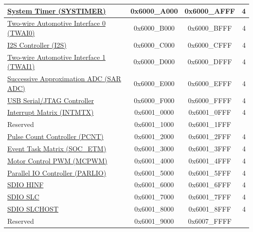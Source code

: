 \begin{ThreePartTable}
\begin{longtable}[c]{ |p{7cm}|c|c|r| }
\hyperref[mod:systimer]{System Timer (SYSTIMER)}                & 0x6000\_A000 & 0x6000\_AFFF &   4        \\\hline
\hyperref[mod:twai]{Two-wire Automotive Interface 0 (TWAI0)}                      & 0x6000\_B000 & 0x6000\_BFFF &   4        \\\hline
\hyperref[mod:i2s]{I2S Controller (I2S)}            & 0x6000\_C000 & 0x6000\_CFFF &   4     \\\hline
\hyperref[mod:twai]{Two-wire Automotive Interface 1 (TWAI1)}                      & 0x6000\_D000 & 0x6000\_DFFF &   4        \\\hline
\hyperref[mod:sensor]{Successive Approximation ADC (SAR ADC)}              & 0x6000\_E000 & 0x6000\_EFFF &   4        \\\hline
\hyperref[mod:usbserialjtag]{USB Serial/JTAG Controller}                  & 0x6000\_F000 & 0x6000\_FFFF &   4     \\\hline

\hyperref[mod:intmtrx]{Interrupt Matrix (INTMTX)}            & 0x6001\_0000 & 0x6001\_0FFF &   4     \\\hline
    \rowcolor{gray!25}  Reserved                    & 0x6001\_1000 & 0x6001\_1FFF &        \\\hline
\hyperref[mod:pcnt]{Pulse Count Controller (PCNT)}& 0x6001\_2000 & 0x6001\_2FFF &   4        \\\hline
\hyperref[mod:evntaskmatrix]{Event Task Matrix (SOC\_ETM)} & 0x6001\_3000 & 0x6001\_3FFF &   4     \\\hline
\hyperref[mod:mcpwm]{Motor Control PWM (MCPWM)} & 0x6001\_4000 & 0x6001\_4FFF &   4     \\\hline
\hyperref[mod:parlio]{Parallel IO Controller (PARLIO)}                     & 0x6001\_5000 & 0x6001\_5FFF &   4        \\\hline
\hyperref[mod:sdioslave]{SDIO HINF}\tnote{\textcolor{red}{*}}& 0x6001\_6000 & 0x6001\_6FFF &   4     \\\hline
\hyperref[mod:sdioslave]{SDIO SLC}\tnote{\textcolor{red}{*}} & 0x6001\_7000 & 0x6001\_7FFF &   4  \\\hline
\hyperref[mod:sdioslave]{SDIO SLCHOST} \tnote{\textcolor{red}{*}}                   & 0x6001\_8000 & 0x6001\_8FFF &   4 \\\hline
    \rowcolor{gray!25}  Reserved                    & 0x6001\_9000 & 0x6007\_FFFF &        \\\hline


\end{longtable}
\end{ThreePartTable}
